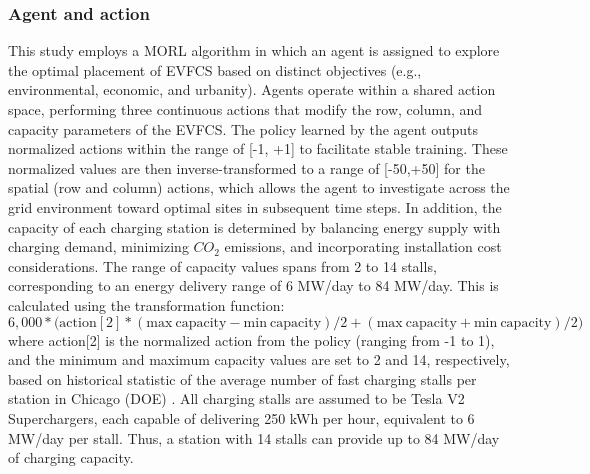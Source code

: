 \documentclass[preprint,12pt]{elsarticle}
\begin{document}
\subsubsection{Agent and action}
This study employs a MORL algorithm in which an agent is assigned to explore the optimal placement of EVFCS based on distinct objectives (e.g., environmental, economic, and urbanity). Agents operate within a shared action space, performing three continuous actions that modify the row, column, and capacity parameters of the EVFCS. The policy learned by the agent outputs normalized actions within the range of [-1, +1] to facilitate stable training. These normalized values are then inverse-transformed to a range of [-50,+50] for the spatial (row and column) actions, which allows the agent to investigate across the grid environment toward optimal sites in subsequent time steps. In addition, the capacity of each charging station is determined by balancing energy supply with charging demand, minimizing $CO_2$ emissions, and incorporating installation cost considerations. The range of capacity values spans from 2 to 14 stalls, corresponding to an energy delivery range of 6 MW/day to 84 MW/day. This is calculated using the transformation function:
\begin{equation}
    6,000 * (\mathrm{action[2] * (\mathrm{max \: capacity} - \mathrm{min \: capacity})/2 + (\mathrm{max \: capacity} + \mathrm{min \: capacity})/2)}
\end{equation} where action[2] is the normalized action from the policy (ranging from -1 to 1), and the minimum and maximum capacity values are set to 2 and 14, respectively, based on historical statistic of the average number of fast charging stalls per station in Chicago (DOE) \cite{DOE_EVCSL}. All charging stalls are assumed to be Tesla V2 Superchargers, each capable of delivering 250 kWh per hour, equivalent to 6 MW/day per stall. Thus, a station with 14 stalls can provide up to 84 MW/day of charging capacity. 
\end{document}
